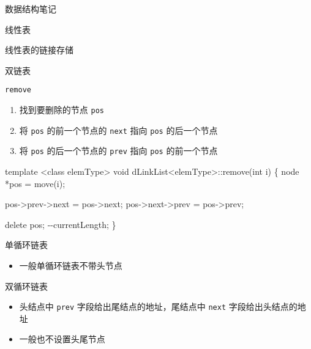 \documentclass[
  ignorenonframetext,
]{beamer}
\newenvironment{Shaded}{}{}
\newcommand{\NormalTok}[1]{#1}
\providecommand{\tightlist}{%
  \setlength{\itemsep}{0pt}\setlength{\parskip}{0pt}}
\begin{document}
\begin{frame}[fragile]{数据结构笔记}
\begin{block}{线性表}
\begin{block}{线性表的链接存储}
\begin{block}{双链表}
\begin{block}{\texttt{remove}}
\protect{}\label{remove-2}
\begin{enumerate}
\tightlist
\item
  找到要删除的节点 \texttt{pos}
\item
  将 \texttt{pos} 的前一个节点的 \texttt{next} 指向 \texttt{pos}
  的后一个节点
\item
  将 \texttt{pos} 的后一个节点的 \texttt{prev} 指向 \texttt{pos}
  的前一个节点
\end{enumerate}


\begin{Shaded}
\begin{Highlighting}[]
\NormalTok{template \textless{}class elemType\textgreater{}}
\NormalTok{void dLinkList\textless{}elemType\textgreater{}::remove(int i)}
\NormalTok{\{}
\NormalTok{  node *pos = move(i);}

\NormalTok{  pos{-}\textgreater{}prev{-}\textgreater{}next = pos{-}\textgreater{}next;}
\NormalTok{  pos{-}\textgreater{}next{-}\textgreater{}prev = pos{-}\textgreater{}prev;}

\NormalTok{  delete pos;}
\NormalTok{  {-}{-}currentLength;}
\NormalTok{\}}
\end{Highlighting}
\end{Shaded}
\end{block}
\end{block}

\begin{block}{单循环链表}
\protect{}\label{ux5355ux5faaux73afux94feux8868}
\begin{itemize}
\tightlist
\item
  一般单循环链表不带头节点
\end{itemize}

\end{block}

\begin{block}{双循环链表}
\protect{}\label{ux53ccux5faaux73afux94feux8868}
\begin{itemize}
\tightlist
\item
  头结点中 \texttt{prev} 字段给出尾结点的地址，尾结点中 \texttt{next}
  字段给出头结点的地址
\item
  一般也不设置头尾节点
\end{itemize}
\end{block}
\end{block}
\end{block}


\end{frame}
\end{document}
